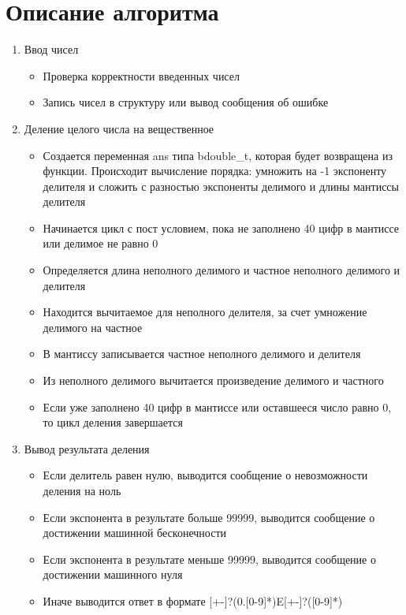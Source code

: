 \chapter{Описание алгоритма}
\begin{enumerate}
	\item Ввод чисел
	\begin{itemize}
		\item Проверка корректности введенных чисел
		\item Запись чисел в структуру или вывод сообщения об ошибке
	\end{itemize}
	\item Деление целого числа на вещественное
	\begin{itemize}
		\item Создается переменная ans типа bdouble\_t, которая будет возвращена из функции. Происходит вычисление порядка: умножить на -1 экспоненту делителя и сложить с разностью экспоненты делимого и длины мантиссы делителя
		\item Начинается цикл с пост условием, пока не заполнено 40 цифр в мантиссе или делимое не равно 0
		\item Определяется длина неполного делимого и частное неполного делимого и делителя
		\item Находится вычитаемое для неполного делителя, за счет умножение делимого на частное 
		\item В мантиссу записывается частное неполного делимого и делителя 
		\item Из неполного делимого вычитается произведение делимого и частного
		\item Если уже заполнено 40 цифр в мантиссе или оставшееся число равно 0, то цикл деления завершается
	\end{itemize}
	\item Вывод результата деления
	\begin{itemize}
		\item Если делитель равен нулю, выводится сообщение о невозможности деления на ноль
		\item Если экспонента в результате больше 99999, выводится сообщение о достижении машинной бесконечности
		\item  Если экспонента в результате меньше 99999, выводится сообщение о достижении машинного нуля
		\item Иначе выводится ответ в формате [+-]?(0.[0-9]*)E[+-]?([0-9]*)
	\end{itemize}
\end{enumerate}

